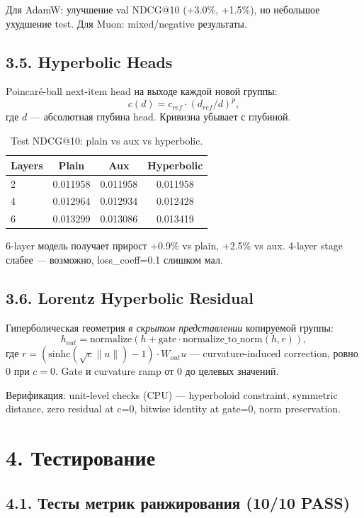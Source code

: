 \documentclass[11pt,a4paper]{article}
\begin{document}
Для AdamW: улучшение val NDCG@10 (+3.0\%, +1.5\%), но небольшое ухудшение test.
Для Muon: mixed/negative результаты.

\subsection*{3.5. Hyperbolic Heads}

Poincar\'e-ball next-item head на выходе каждой новой группы:
\[
c(d) = c_{ref} \cdot (d_{ref} / d)^p,
\]
где $d$ — абсолютная глубина head. Кривизна убывает с глубиной.

\begin{table}[H]
\centering
\begin{tabular}{lccc}
\toprule
Layers & Plain & Aux & Hyperbolic \\
\midrule
2 & 0.011958 & 0.011958 & 0.011958 \\
4 & 0.012964 & 0.012934 & 0.012428 \\
6 & 0.013299 & 0.013086 & 0.013419 \\
\bottomrule
\end{tabular}
\caption{Test NDCG@10: plain vs aux vs hyperbolic.}
\end{table}

6-layer модель получает прирост +0.9\% vs plain, +2.5\% vs aux.
4-layer stage слабее — возможно, loss\_coeff=0.1 слишком мал.

\subsection*{3.6. Lorentz Hyperbolic Residual}

Гиперболическая геометрия \textit{в скрытом представлении} копируемой группы:
\[
h_{out} = \text{normalize}(h + \text{gate} \cdot \text{normalize\_to\_norm}(h, r)),
\]
где $r = (\text{sinhc}(\sqrt{c}\|u\|) - 1) \cdot W_{out} u$ — curvature-induced
correction, ровно 0 при $c=0$. Gate и curvature ramp от 0 до целевых значений.

Верификация: unit-level checks (CPU) — hyperboloid constraint, symmetric
distance, zero residual at c=0, bitwise identity at gate=0, norm preservation.

\section*{4. Тестирование}

\subsection*{4.1. Тесты метрик ранжирования (10/10 PASS)}
\end{document}
